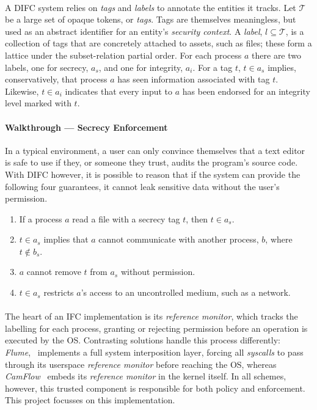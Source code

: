 \paragraph{} A DIFC system relies on \textit{tags} and \textit{labels} to annotate the entities it tracks. Let $\mathcal{T}$ be a large set of opaque tokens, or \textit{tags}. Tags are themselves meaningless, but used as an abstract identifier for an entity's \textit{security context}. A \textit{label}, $l \subseteq \mathcal{T}$, is a collection of tags that are concretely attached to assets, such as files; these form a lattice under the subset-relation partial order. For each process $a$ there are two labels, one for secrecy, $a_s$, and one for integrity, $a_i$. For a tag $t$, $t \in a_s$ implies, conservatively, that process $a$ has seen information associated with tag $t$. Likewise, $t \in a_i$ indicates that every input to $a$ has been endorsed for an integrity level marked with $t$.

\paragraph{Walkthrough --- Secrecy Enforcement} In a typical environment, a user can only convince themselves that a text editor is safe to use if they, or someone they trust, audits the program's source code. With DIFC however, it is possible to reason that if the system can provide the following four guarantees, it cannot leak sensitive data without the user's permission.

\begin{enumerate}
    \item If a process $a$ read a file with a secrecy tag $t$, then $t \in a_s$.
    \item $t \in a_s$ implies that $a$ cannot communicate with another process, $b$, where $t \notin b_s$.
    \item $a$ cannot remove $t$ from $a_s$ without permission.
    \item $t \in a_s$ restricts $a$'s access to an uncontrolled medium, such as a network.
\end{enumerate}

\paragraph{} The heart of an IFC implementation is its \textit{reference monitor}, which tracks the labelling for each process, granting or rejecting permission before an operation is executed by the OS. Contrasting solutions handle this process differently: \textit{Flume},~\cite{flume} implements a full system interposition layer, forcing all \textit{syscalls} to pass through its userspace \textit{reference monitor} before reaching the OS, whereas \textit{CamFlow}~\cite{camflow} embeds its \textit{reference monitor} in the kernel itself. In all schemes, however, this trusted component is responsible for both policy and enforcement. This project focusses on this implementation.


